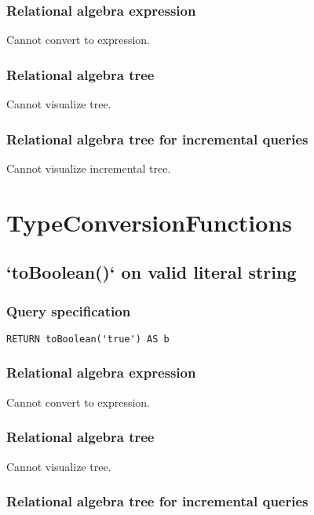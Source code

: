 \subsubsection*{Relational algebra expression}

Cannot convert to expression.

\subsubsection*{Relational algebra tree}

Cannot visualize tree.

\subsubsection*{Relational algebra tree for incremental queries}

Cannot visualize incremental tree.

\section{TypeConversionFunctions}

\subsection{`toBoolean()` on valid literal string}

\subsubsection*{Query specification}

\begin{lstlisting}
RETURN toBoolean('true') AS b
\end{lstlisting}

\subsubsection*{Relational algebra expression}

Cannot convert to expression.

\subsubsection*{Relational algebra tree}

Cannot visualize tree.

\subsubsection*{Relational algebra tree for incremental queries}

